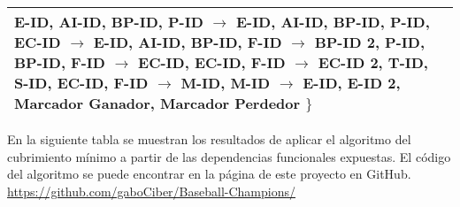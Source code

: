 \documentclass{report}
\begin{document}
\begin{tabularx}{\textwidth}{|X|}
        \hspace*{0.9cm} E-ID, AI-ID, BP-ID, P-ID $\rightarrow$ E-ID, AI-ID, BP-ID, P-ID, \newline
        \hspace*{0.9cm} EC-ID $\rightarrow$ E-ID, AI-ID, \newline
        \hspace*{0.9cm} BP-ID, F-ID $\rightarrow$ BP-ID 2, P-ID, \newline
        \hspace*{0.9cm} BP-ID, F-ID $\rightarrow$ EC-ID, \newline
        \hspace*{0.9cm} EC-ID, F-ID $\rightarrow$ EC-ID 2, T-ID, S-ID, \newline
        \hspace*{0.9cm} EC-ID, F-ID $\rightarrow$ M-ID, \newline
        \hspace*{0.9cm} M-ID $\rightarrow$ E-ID, E-ID 2, Marcador Ganador, Marcador Perdedor        
        $\} $
        \vspace*{0.15cm} \\    
        \bottomrule
    \end{tabularx}

    \vspace*{0.3cm}
    En la siguiente tabla se muestran los resultados de aplicar el algoritmo del cubrimiento mínimo a partir de las dependencias funcionales expuestas. 
    El código del algoritmo se puede encontrar en la página de este proyecto en GitHub. \url{https://github.com/gaboCiber/Baseball-Champions/} 
\end{document}
